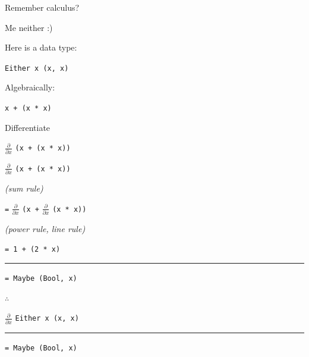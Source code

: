 \begin{frame}
\begin{center}
Remember calculus?
\end{center}
\end{frame}


\begin{frame}
\begin{center}
Me neither :)
\end{center}
\end{frame}


\begin{frame}
\begin{center}
Here is a data type:

\lstinline{Either x (x, x)}
\end{center}
\end{frame}


\begin{frame}
\begin{center}
Algebraically:

\lstinline{x + (x * x)}
\end{center}
\end{frame}


\begin{frame}
\begin{center}
Differentiate

$\frac{\partial}{\partial x}$ \lstinline{(x + (x * x))}
\end{center}
\end{frame}


\begin{frame}
\begin{center}
$\frac{\partial}{\partial x}$ \lstinline{(x + (x * x))}

\tiny{\emph{(sum rule)}}\normalsize{}

\lstinline{=} $\frac{\partial}{\partial x}$ \lstinline{(x +} $\frac{\partial}{\partial x}$ \lstinline{(x * x))}

\tiny{\emph{(power rule, line rule)}}\normalsize{}

\lstinline{= 1 + (2 * x)}

\par\noindent\rule{\textwidth}{0.4pt}

\lstinline{= Maybe (Bool, x)}
\end{center}
\end{frame}


\begin{frame}
\begin{block}{$\therefore$}
\begin{center}
$\frac{\partial}{\partial x}$ \lstinline{Either x (x, x)}

\par\noindent\rule{\textwidth}{0.4pt}

\lstinline{= Maybe (Bool, x)}
\end{center}
\end{block}
\end{frame}


